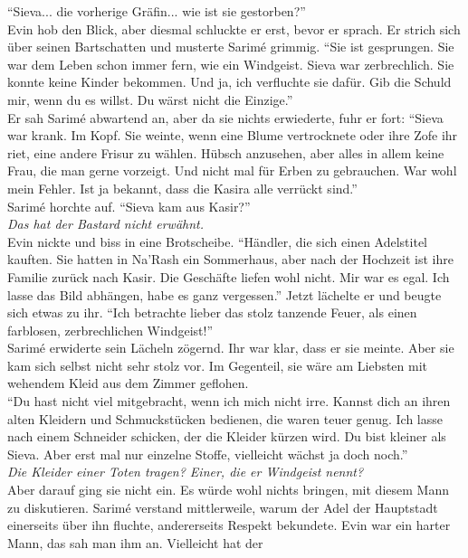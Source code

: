 ``Sieva... die vorherige Gräfin... wie ist sie gestorben?''\\
Evin hob den Blick, aber diesmal schluckte er erst, bevor er sprach. Er strich sich über seinen 
Bartschatten und musterte Sarimé grimmig. ``Sie ist gesprungen. Sie war dem Leben schon immer fern, 
wie ein Windgeist. Sieva war zerbrechlich. Sie konnte keine Kinder bekommen. Und ja, ich verfluchte 
sie dafür. Gib die Schuld mir, wenn du es willst. Du wärst nicht die Einzige.''\\
Er sah Sarimé abwartend an, aber da sie nichts erwiederte, fuhr er fort: ``Sieva war krank. Im 
Kopf. Sie weinte, wenn eine Blume vertrocknete oder ihre Zofe ihr riet, eine andere Frisur zu 
wählen. Hübsch anzusehen, aber alles in allem keine Frau, die man gerne vorzeigt. Und nicht mal für 
Erben zu gebrauchen. War wohl mein Fehler. Ist ja bekannt, dass die Kasira alle verrückt sind.''\\
Sarimé horchte auf. ``Sieva kam aus Kasir?''\\
\textit{Das hat der Bastard nicht erwähnt.}\\
Evin nickte und biss in eine Brotscheibe. ``Händler, die sich einen Adelstitel kauften. Sie hatten 
in Na'Rash ein Sommerhaus, aber nach der Hochzeit ist ihre Familie zurück nach Kasir. Die Geschäfte 
liefen wohl nicht. Mir war es egal. Ich lasse das Bild abhängen, habe es ganz vergessen.'' Jetzt 
lächelte er und beugte sich etwas zu ihr. ``Ich betrachte lieber das stolz tanzende Feuer, als 
einen farblosen, zerbrechlichen Windgeist!''\\
Sarimé erwiderte sein Lächeln zögernd. Ihr war klar, dass er sie meinte. Aber sie kam sich selbst 
nicht sehr stolz vor. Im Gegenteil, sie wäre am Liebsten mit wehendem Kleid aus dem Zimmer 
geflohen. \\
``Du hast nicht viel mitgebracht, wenn ich mich nicht irre. Kannst dich an ihren alten Kleidern und 
Schmuckstücken bedienen, die waren teuer genug. Ich lasse nach einem Schneider schicken, der die 
Kleider kürzen wird. Du bist kleiner als Sieva. Aber erst mal nur einzelne Stoffe, vielleicht 
wächst ja doch noch.''\\
\textit{Die Kleider einer Toten tragen? Einer, die er Windgeist nennt?}\\
Aber darauf ging sie nicht ein. Es würde wohl nichts bringen, mit diesem Mann zu diskutieren. 
Sarimé verstand mittlerweile, warum der Adel der Hauptstadt einerseits über ihn fluchte, 
andererseits Respekt bekundete. Evin war ein harter Mann, das sah man ihm an. Vielleicht hat der 
